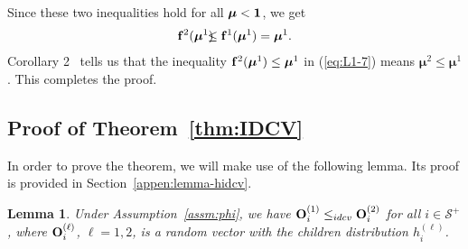 \documentclass[10pt, journal, compsoc]{IEEEtran}
\newcommand {\cS}{{\mathcal{S}}}
\newcommand {\bff} {{\bf f}}
\newcommand {\bd} {{\bf d}}
\newcommand {\bmu} {\boldsymbol{\mu}}
\newcommand {\Z} {{\mathbbm Z}}
\newtheorem{lemma}{Lemma}
\newcommand{\beqa}{\begin{eqnarray}}
\newcommand{\eeqa}{\end{eqnarray}}
\newcommand{\myb}{\hspace{-0.1in}}
\newcommand{\myeq}{& \hspace{-0.1in} = & \hspace{-0.1in}}
\newcommand{\lb}{\nonumber \\}
\newcommand{\myleq}{& \myb \leq & \myb}
\newcommand{\myskip}{\\ \vspace{-0.1in}}
\begin{document}
Since these two inequalities hold for all $\bmu < {\bf 1}$, 
we get 
\beqa
\bff^2(\bmu^1) 
\myleq \bff^1(\bmu^1) = \bmu^1. 
	\label{eq:L1-7}
\eeqa
Corollary 2~\cite[p. 42]{Harris} tells us that
the inequality $\bff^2(\bmu^1) \leq \bmu^1$ 
in (\ref{eq:L1-7}) means $\bmu^2 \leq \bmu^1$. 
This completes the proof. 




%
%





\subsection{Proof of Theorem~\ref{thm:IDCV}}
	\label{appen:IDCV}
	
In order to prove the theorem, we will make
use of the following lemma. Its proof is
provided in Section~\ref{appen:lemma-hidcv}.
\myskip

\begin{lemma}	\label{lemma:hidcv}
Under Assumption~\ref{assm:phi}, we have
${\bf O}^{(1)}_i \leq_{idcv} {\bf O}^{(2)}_i$
for all $i \in \cS^+$, 
where ${\bf O}^{(\ell)}_i$, $\ell = 1, 2$,
is a random vector with the children distribution
$h^{(\ell)}_i$.
\myskip
\end{lemma}
 
\end{document}

